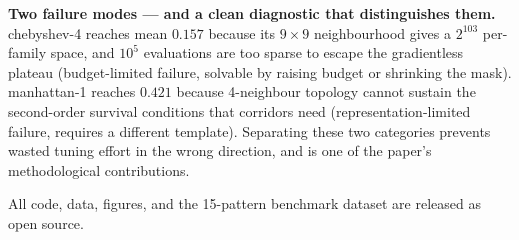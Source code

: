 \noindent\textbf{Two failure modes — and a clean diagnostic that distinguishes them.} chebyshev-4 reaches mean $0.157$ because its $9{\times}9$ neighbourhood gives a $2^{103}$ per-family space, and $10^5$ evaluations are too sparse to escape the gradientless plateau (budget-limited failure, solvable by raising budget or shrinking the mask). manhattan-1 reaches $0.421$ because 4-neighbour topology cannot sustain the second-order survival conditions that corridors need (representation-limited failure, requires a different template). Separating these two categories prevents wasted tuning effort in the wrong direction, and is one of the paper's methodological contributions.

\noindent All code, data, figures, and the 15-pattern benchmark dataset are released as open source.
